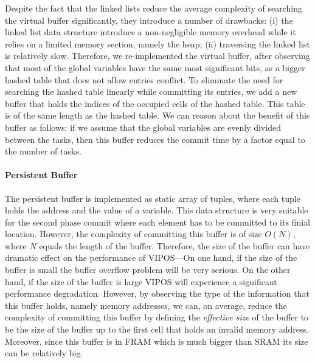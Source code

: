 			Despite the fact that the linked lists reduce the average complexity of searching the virtual buffer significantly, they introduce a number of drawbacks: (i) the linked list data structure introduce a non-negligible memory overhead while it relies on a limited memory section, namely the heap; (ii) traversing the linked list is relatively slow. Therefore, we re-implemented the virtual buffer, after observing that most of the global variables have the same most significant bits, as a bigger hashed table that does not allow entries conflict. To eliminate the need for searching the hashed table linearly while committing its entries, we add a new buffer that holds the indices of the occupied cells of the hashed table. This table is of the same length as the hashed table. We can reason about the benefit of this buffer as follows: if we assume that the global variables are evenly divided between the tasks, then this buffer reduces the commit time by a factor equal to the number of tasks.   

		\paragraph{Persistent Buffer}
			The persistent buffer is implemented as static array of tuples, where each tuple holds  the address and the value of a variable. This data structure is very suitable for the second phase commit where each element has to be committed to its finial location. However, the complexity of committing this buffer is of size $O(N)$, where $N$ equals the length of the buffer. Therefore, the size of the buffer can have dramatic effect on the performance of VIPOS---On one hand, if the size of the buffer is small the buffer overflow problem will be very serious. On the other hand, if the size of the buffer is large VIPOS will experience a significant performance degradation. However, by observing the type of the information that this buffer holds, namely memory addresses, we can, on average, reduce the complexity of committing this buffer by defining the \emph{effective size} of the buffer to be the size of the buffer up to the first cell that holds an invalid memory address. Moreover, since this buffer is in FRAM which is much bigger than SRAM its size can be relatively big. 


